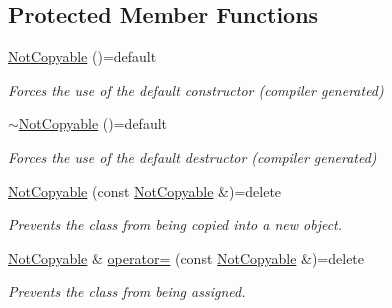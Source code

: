 \subsection*{Protected Member Functions}
\begin{DoxyCompactItemize}
\item 
\hypertarget{class_not_copyable_a699d7796c8e55358a117f4275679e061}{}\hyperlink{class_not_copyable_a699d7796c8e55358a117f4275679e061}{Not\+Copyable} ()=default\label{class_not_copyable_a699d7796c8e55358a117f4275679e061}

\begin{DoxyCompactList}\small\item\em Forces the use of the default constructor (compiler generated) \end{DoxyCompactList}\item 
\hypertarget{class_not_copyable_a38c705954a6f58f35795e60f469f5dce}{}\hyperlink{class_not_copyable_a38c705954a6f58f35795e60f469f5dce}{$\sim$\+Not\+Copyable} ()=default\label{class_not_copyable_a38c705954a6f58f35795e60f469f5dce}

\begin{DoxyCompactList}\small\item\em Forces the use of the default destructor (compiler generated) \end{DoxyCompactList}\item 
\hypertarget{class_not_copyable_a59d348136f6fceb82cb68d30f90273a1}{}\hyperlink{class_not_copyable_a59d348136f6fceb82cb68d30f90273a1}{Not\+Copyable} (const \hyperlink{class_not_copyable}{Not\+Copyable} \&)=delete\label{class_not_copyable_a59d348136f6fceb82cb68d30f90273a1}

\begin{DoxyCompactList}\small\item\em Prevents the class from being copied into a new object. \end{DoxyCompactList}\item 
\hypertarget{class_not_copyable_a37869575f765a67ea09f189e84bb2420}{}\hyperlink{class_not_copyable}{Not\+Copyable} \& \hyperlink{class_not_copyable_a37869575f765a67ea09f189e84bb2420}{operator=} (const \hyperlink{class_not_copyable}{Not\+Copyable} \&)=delete\label{class_not_copyable_a37869575f765a67ea09f189e84bb2420}

\begin{DoxyCompactList}\small\item\em Prevents the class from being assigned. \end{DoxyCompactList}\end{DoxyCompactItemize}


